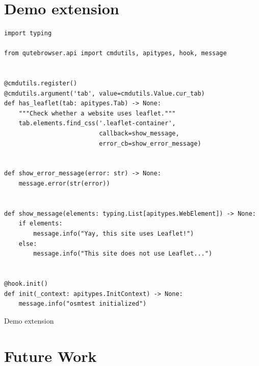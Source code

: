 \documentclass[a4paper,parskip=full]{scrreprt}
\begin{document}
\section{Demo extension}
\begin{listing}
\begin{verbatim}
import typing

from qutebrowser.api import cmdutils, apitypes, hook, message


@cmdutils.register()
@cmdutils.argument('tab', value=cmdutils.Value.cur_tab)
def has_leaflet(tab: apitypes.Tab) -> None:
    """Check whether a website uses leaflet."""
    tab.elements.find_css('.leaflet-container',
                          callback=show_message,
                          error_cb=show_error_message)


def show_error_message(error: str) -> None:
    message.error(str(error))


def show_message(elements: typing.List[apitypes.WebElement]) -> None:
    if elements:
        message.info("Yay, this site uses Leaflet!")
    else:
        message.info("This site does not use Leaflet...")


@hook.init()
def init(_context: apitypes.InitContext) -> None:
    message.info("osmtest initialized")
\end{verbatim}
\caption{Demo extension}
\end{listing}

\section{Future Work}

% 
% 
% 
\end{document}
